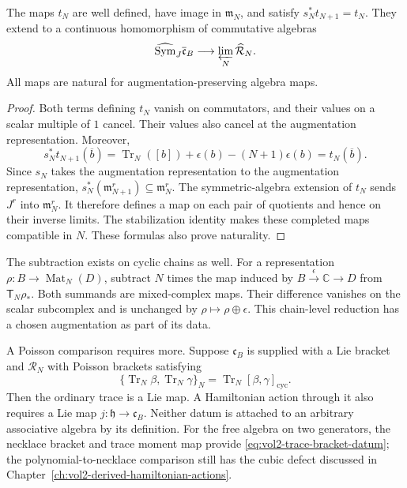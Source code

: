 \begin{proposition}\label{prop:vol2-reduced-trace-completion}
The maps $t_N$ are well defined, have image in
$\mathfrak m_N$, and satisfy $s_N^*t_{N+1}=t_N$.
They extend to a continuous homomorphism of commutative algebras
\[
 \widehat{\operatorname{Sym}}_J\overline{\mathfrak c}_B
 \longrightarrow \varprojlim_N\widehat{\mathcal R}_N.
\]
All maps are natural for augmentation-preserving algebra maps.
\end{proposition}
\begin{proof}
Both terms defining $t_N$ vanish on commutators, and their
values on a scalar multiple of $1$ cancel.
Their values also cancel at the augmentation representation.
Moreover,
\[
 s_N^*t_{N+1}(\overline b)
 =\operatorname{Tr}_N([b])+\epsilon(b)-(N+1)\epsilon(b)
 =t_N(\overline b).
\]
Since $s_N$ takes the augmentation representation to the
augmentation representation,
$s_N^*(\mathfrak m_{N+1}^r)\subseteq\mathfrak m_N^r$.
The symmetric-algebra extension of $t_N$ sends $J^r$ into
$\mathfrak m_N^r$. It therefore defines a map on each pair of
quotients and hence on their inverse limits.
The stabilization identity makes these completed maps
compatible in $N$. These formulas also prove naturality.
\end{proof}

The subtraction exists on cyclic chains as well.
For a representation $\rho:B\to\operatorname{Mat}_N(D)$,
subtract $N$ times the map induced by
$B\xrightarrow{\epsilon}\mathbb C\to D$ from
$\mathsf T_N\rho_*$.
Both summands are mixed-complex maps.
Their difference vanishes on the scalar subcomplex and is
unchanged by $\rho\mapsto\rho\oplus\epsilon$.
This chain-level reduction has a chosen augmentation as
part of its data.

A Poisson comparison requires more.
Suppose $\mathfrak c_B$ is supplied with a Lie bracket and
$\mathcal R_N$ with Poisson brackets satisfying
\begin{equation}\label{eq:vol2-trace-bracket-datum}
 \{\operatorname{Tr}_N\beta,\operatorname{Tr}_N\gamma\}_N
 =\operatorname{Tr}_N[\beta,\gamma]_{\mathrm{cyc}}.
\end{equation}
Then the ordinary trace is a Lie map.
A Hamiltonian action through it also requires a Lie map
$j:\mathfrak h\to\mathfrak c_B$.
Neither datum is attached to an arbitrary associative
algebra by its definition.
For the free algebra on two generators, the necklace bracket
and trace moment map provide
\eqref{eq:vol2-trace-bracket-datum};
the polynomial-to-necklace comparison still has the cubic
defect discussed in Chapter~\ref{ch:vol2-derived-hamiltonian-actions}.

